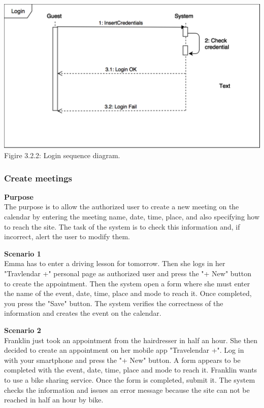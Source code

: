 \documentclass{article}
\begin{document}
	\bigskip
	\begin{center}
		\includegraphics[scale=0.25]{img/diagrams/login_sd.png} \\  \bigskip
		Figire 3.2.2: Login sequence diagram.
	\end{center}
	

	\subsubsection{Create meetings}
	
	\bigskip
	\noindent
	\textbf{Purpose} \\
	The purpose is to allow the authorized user to create a new meeting on the calendar by entering the meeting name, date, time, place, and also specifying how to reach the site. The task of the system is to check this information and, if incorrect, alert the user to modify them.
	
	\bigskip
	\noindent
	\textbf{Scenario 1} \\
	Emma has to enter a driving lesson for tomorrow. Then she logs in her "Travlendar +" personal page as authorized user and press the "+ New" button to create the appointment. Then the system open a form where she must enter the name of the event, date, time, place and mode to reach it. Once completed, you press the "Save" button. The system verifies the correctness of the information and creates the event on the calendar.
	
	\bigskip
	\noindent
	\textbf{Scenario 2} \\
	Franklin just took an appointment from the hairdresser in half an hour. She then decided to create an appointment on her mobile app "Travelendar +". Log in with your smartphone and press the "+ New" button. A form appears to be completed with the event, date, time, place and mode to reach it. Franklin wants to use a bike sharing service. Once the form is completed, submit it. The system checks the information and issues an error message because the site can not be reached in half an hour by bike.
	
\end{document}
